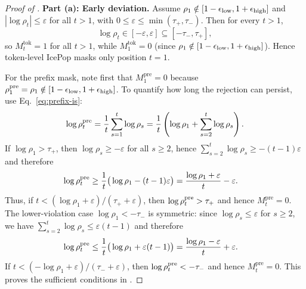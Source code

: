 \begin{proof}[Proof of ]
\noindent\textbf{Part (a): Early deviation.}
Assume $\rho_1 \notin [1-\epsilon_{\mathrm{low}},1+\epsilon_{\mathrm{high}}]$ and $|\log\rho_t| \le \varepsilon$ for all $t>1$, with
$0 \le \varepsilon \le \min(\tau_+,\tau_-)$. Then for every $t>1$,
\begin{equation*}
    \log\rho_t \in [-\varepsilon,\varepsilon] \subseteq [-\tau_-,\tau_+],
\end{equation*}
so $M_t^{\mathrm{tok}}=1$ for all $t>1$, while $M_1^{\mathrm{tok}}=0$ (since $\rho_1 \notin [1-\epsilon_{\mathrm{low}},1+\epsilon_{\mathrm{high}}]$). Hence token-level
IcePop masks only position $t=1$.

\smallskip
For the prefix mask, note first that $M_1^{\mathrm{pre}}=0$ because $\rho_{1}^{\mathrm{pre}}=\rho_1\notin[1-\epsilon_{\mathrm{low}},1+\epsilon_{\mathrm{high}}]$. To quantify how
long the rejection can persist, use Eq.~\eqref{eq:prefix-is}:
\begin{equation*}
    \log\rho_{t}^{\mathrm{pre}}
    = \frac{1}{t}\sum_{s=1}^{t} \log\rho_s
    = \frac{1}{t}\left(\log\rho_1 + \sum_{s=2}^{t}\log\rho_s\right).
\end{equation*}
If $\log\rho_1>\tau_+$, then $\log\rho_s \ge -\varepsilon$ for all $s\ge2$, hence $\sum_{s=2}^{t}\log\rho_s \ge -(t-1)\varepsilon$ and therefore
\begin{align*}
    \log\rho_{t}^{\mathrm{pre}}
    &\ge \frac{1}{t}\big(\log\rho_1-(t-1)\varepsilon\big)
    = \frac{\log\rho_1+\varepsilon}{t} - \varepsilon.
\end{align*}
Thus, if $t < (\log\rho_1+\varepsilon)/(\tau_+ + \varepsilon)$, then $\log\rho_{t}^{\mathrm{pre}}>\tau_+$ and hence $M_t^{\mathrm{pre}}=0$.
The lower-violation case $\log\rho_1<-\tau_-$ is symmetric: since $\log\rho_s \le \varepsilon$ for $s\ge2$, we have
$\sum_{s=2}^{t}\log\rho_s \le \varepsilon(t-1)$ and therefore
\begin{align*}
    \log\rho_{t}^{\mathrm{pre}}
    &\le \frac{1}{t}\big(\log\rho_1+\varepsilon(t-1)\big)
    = \frac{\log\rho_1-\varepsilon}{t} + \varepsilon.
\end{align*}
If $t < (-\log\rho_1+\varepsilon)/(\tau_-+\varepsilon)$, then $\log\rho_{t}^{\mathrm{pre}} < -\tau_-$ and hence $M_t^{\mathrm{pre}}=0$.
This proves the sufficient conditions in .


\end{proof}
